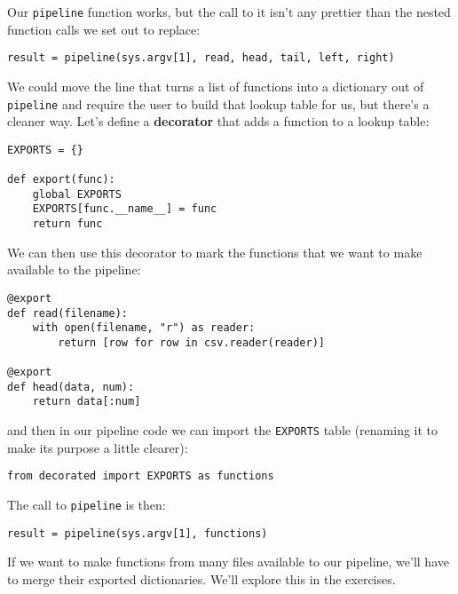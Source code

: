 \documentclass{scrbook}
\newcommand{\glossref}[1]{\textbf{#1}}
\begin{document}
Our \texttt{pipeline} function works,
but the call to it isn't any prettier
than the nested function calls we set out to replace:


\begin{lstlisting}[frame=single,frameround=tttt]
result = pipeline(sys.argv[1], read, head, tail, left, right)
\end{lstlisting}



We could move the line that turns a list of functions into a dictionary
out of \texttt{pipeline}
and require the user to build that lookup table for us,
but there's a cleaner way.
Let's define a \glossref{decorator}
that adds a function to a lookup table:


\begin{lstlisting}[frame=single,frameround=tttt]
EXPORTS = {}

def export(func):
    global EXPORTS
    EXPORTS[func.__name__] = func
    return func
\end{lstlisting}



\noindent We can then use this decorator
to mark the functions that we want to make available
to the pipeline:


\begin{lstlisting}[frame=single,frameround=tttt]
@export
def read(filename):
    with open(filename, "r") as reader:
        return [row for row in csv.reader(reader)]

@export
def head(data, num):
    return data[:num]
\end{lstlisting}



\noindent and then in our pipeline code
we can import the \texttt{EXPORTS} table
(renaming it to make its purpose a little clearer):


\begin{lstlisting}[frame=single,frameround=tttt]
from decorated import EXPORTS as functions
\end{lstlisting}



\noindent The call to \texttt{pipeline} is then:


\begin{lstlisting}[frame=single,frameround=tttt]
result = pipeline(sys.argv[1], functions)
\end{lstlisting}



If we want to make functions from many files
available to our pipeline,
we'll have to merge their exported dictionaries.
We'll explore this in the exercises.
\end{document}
